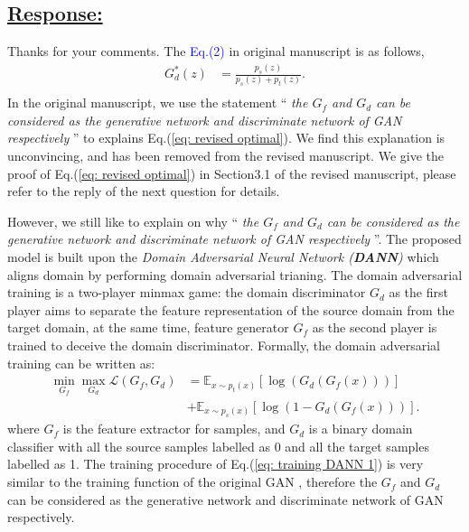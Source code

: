 \subsection*{\underline{\textbf{Response:}}}
Thanks for your comments. 
The \textcolor{blue}{Eq.(2)} in original manuscript is as follows, 
\begin{equation}
    \label{eq: revised optimal}
    \begin{split}
        G_d^*(z) &= \frac{p_s(z)}{p_s(z)+p_t(z)}. \\
    \end{split}
\end{equation}
In the original manuscript, we use the statement `` \textit{the $G_f$ and $G_d$ can be considered as the generative network and discriminate network of GAN respectively} '' to explains Eq.(\ref{eq: revised optimal}). 
We find this explanation is unconvincing, and has been removed from the revised manuscript.
We give the proof of Eq.(\ref{eq: revised optimal}) in Section3.1 of the revised manuscript, please refer to the reply of the next question for details. 

However, we still like to explain on why `` \textit{the $G_f$ and $G_d$ can be considered as the generative network and discriminate network of GAN respectively} ''.
The proposed model is built upon the \textit{Domain Adversarial Neural Network (\textbf{DANN})} \cite{DomainAdversrialNetwork} which aligns domain by performing domain adversarial trianing. 
The domain adversarial training is a two-player minmax game: 
the domain discriminator $G_d$ as the first player aims to separate the feature representation of the source domain from the target domain, at the same time, feature generator $G_f$ as the second player is trained to deceive the domain discriminator. 
Formally, the domain adversarial training can be written as:
\begin{equation}
    \label{eq: training DANN 1}
    \begin{split}
        \min_{G_f} \max_{G_d} \mathscr{L}(G_f,G_d) &=\mathbb{E}_{x\sim p_t(x)} \left[ \log \left(G_d\left(G_f\left(x\right)\right)\right) \right]\\
        &+\mathbb{E}_{x\sim p_s(x)}\left[ \log \left(1-G_d\left(G_f\left(x\right)\right)\right) \right].
    \end{split}
\end{equation}
where $G_f$ is the feature extractor for samples, and $G_d$ is a binary domain classifier with all the source samples labelled as 0 and all the target samples labelled as 1.
The training procedure of Eq.(\ref{eq: training DANN 1}) is very similar to the training function of the original GAN \cite{goodfellow2014generative}, therefore the $G_f$ and $G_d$ can be considered as the generative network and discriminate network of GAN respectively.

